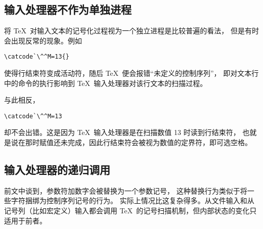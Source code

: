 \documentclass{book}
\begin{document}
\subsection{输入处理器不作为单独进程}

将 \TeX\ 对输入文本的记号化过程视为一个独立进程是比较普遍的看法，
但是有时会出现反常的现象。例如
\begin{verbatim}
\catcode`\^^M=13{}
\end{verbatim}
使得行结束符变成活动符，随后 \TeX\ 便会报错“未定义的控制序列”，
即对文本行中的命令的执行影响到 \TeX\ 输入处理器对该行文本的扫描过程。

与此相反，
\begin{verbatim}
\catcode`\^^M=13
\end{verbatim}
却不会出错。这是因为 \TeX\ 输入处理器是在扫描数值 13 时读到行结束符，
也就是说在那时赋值还未完成，因此行结束符会被视为数值的定界符，即可选空格。

\subsection{输入处理器的递归调用}

前文中谈到，参数符加数字会被替换为一个参数记号，
这种替换行为类似于将一些字符捆绑为控制序列记号的行为。
实际上情况比这复杂得多。从文件输入和从记号列（比如宏定义）输入都会调用
\TeX\ 的记号扫描机制，但内部状态的变化只适用于前者。
\end{document}

